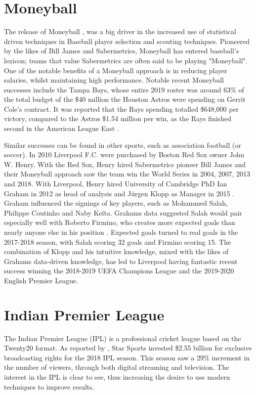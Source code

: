 \documentclass[12pt,a4paper]{report}
\begin{document}
\section{Moneyball}

The release of Moneyball \citep{Moneyball2004}, was a big driver in the increased use of statistical driven techniques in Baseball player selection and scouting techniques. Pioneered by the likes of Bill James and Sabermetrics, Moneyball has entered baseball's lexicon; teams that value Sabermetrics are often said to be playing "Moneyball".  One of the notable benefits of a Moneyball approach is in reducing player salaries, whilst maintaining high performance. Notable recent Moneyball successes include the Tampa Bays, whose entire 2019 roster was around 63\% of the total budget of the \$40 million the Houston Astros were spending on Gerrit Cole's contract. It was reported that the Rays spending totalled \$648,000 per victory, compared to the Astros \$1.54 million per win, as the Rays finished second in the American League East \citep{Fox2019}.

Similar successes can be found in other sports, such as association football (or soccer). In 2010 Liverpool F.C. were purchased by Boston Red Sox owner John W. Henry. With the Red Sox, Henry hired Sabermetrics pioneer Bill James and their Moneyball approach saw the team win the World Series in 2004, 2007, 2013 and 2018. With Liverpool, Henry hired University of Cambridge PhD Ian Graham in 2012 as head of analysis and J\"urgen Klopp as Manager in 2015 \citep{Liverpool2022}. Graham influenced the signings of key players, such as Mohammed Salah, Philippe Coutinho and Naby Ke\"ita. Grahams data suggested Salah would pair especially well with Roberto Firmino, who creates more expected goals than nearly anyone else in his position \citep{Liverpool2019}. Expected goals turned to real goals in the 2017-2018 season, with Salah scoring 32 goals and Firmino scoring 15. The combination of Klopp and his intuitive knowledge, mixed with the likes of Grahams data-driven knowledge, has led to Liverpool having fantastic recent success winning the 2018-2019 UEFA Champions League and the 2019-2020 English Premier League.

\section{Indian Premier League}

The Indian Premier League (IPL) is a professional cricket league based on the Twenty20 format. As reported by \citet{ESPNcricinfo2018}, Star Sports invested \$2.55 billion for exclusive broadcasting rights for the 2018 IPL season. This season saw a 29\% increment in the number of viewers, through both digital streaming and television. The interest in the IPL is clear to see, thus increasing the desire to use modern techniques to improve results.
\end{document}
